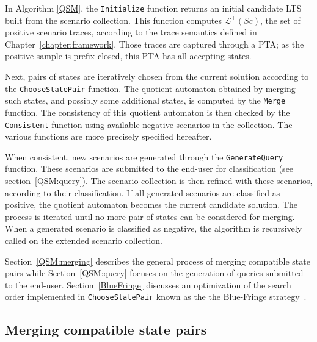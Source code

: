 In Algorithm \ref{QSM}, the \texttt{Initialize} function returns an initial candidate LTS built from the scenario collection. This function computes $\mathcal{L}^+(Sc)$, the set of positive scenario traces, according to the trace semantics defined in Chapter~\ref{chapter:framework}. Those traces are captured through a PTA; as the positive sample is prefix-closed, this PTA has all accepting states.

Next, pairs of states are iteratively chosen from the current solution according to the \texttt{ChooseStatePair} function. The quotient automaton obtained by merging such states, and possibly some additional states, is computed by the \texttt{Merge} function. The consistency of this quotient automaton is then checked by the \texttt{Consistent} function using available negative scenarios in the collection. The various functions are more precisely specified hereafter.

When consistent, new scenarios are generated through the \texttt{GenerateQuery} function. These scenarios are submitted to the end-user for classification (see section~\ref{QSM:query}). The scenario collection is then refined with these scenarios, according to their classification. If all generated scenarios are classified as positive, the quotient automaton becomes the current candidate solution. The process is iterated until no more pair of states can be considered for merging. When a generated scenario is classified as negative, the algorithm is recursively called on the extended scenario collection.

Section~\ref{QSM:merging} describes the general process of merging compatible state pairs while Section~\ref{QSM:query} focuses on the generation of queries submitted to the end-user. Section~\ref{BlueFringe} discusses an optimization of the search order implemented in \texttt{ChooseStatePair} known as the the Blue-Fringe strategy~\cite{Lang:1998}.


\subsection{Merging compatible state pairs\label{QSM:merging}}

